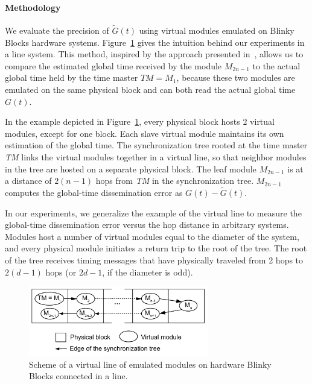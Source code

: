 \paragraph{Methodology}

We evaluate the precision of $\tilde{G}(t)$ using virtual modules emulated on Blinky Blocks hardware systems. Figure~\ref{fig:time-sync:virtual-line} gives the intuition behind our experiments in a line system. This method, inspired by the approach presented in~\cite{romer2005time}, allows us to compare the estimated global time received by the module $M_{2n-1}$ to the actual global time held by the time master $\mathrm{\textit{TM}}  = M_1$, because these two modules are emulated on the same physical block and can both read the actual global time $G(t)$. 

In the example depicted in Figure~\ref{fig:time-sync:virtual-line}, every physical block hosts 2 virtual modules, except for one block. Each slave virtual module maintains its own estimation of the global time. The synchronization tree rooted at the time master \textit{TM} links the virtual modules together in a virtual line, so that neighbor modules in the tree are hosted on a separate physical block. The leaf module $M_{2n-1}$ is at a distance of $2(n-1)$ hops from \textit{TM} in the synchronization tree. $M_{2n-1}$ computes the global-time dissemination error as $G(t) - \tilde{G}(t)$.

In our experiments, we generalize the example of the virtual line to measure the global-time dissemination error versus the hop distance in arbitrary systems. Modules host a number of virtual modules equal to the diameter of the system, and every physical module initiates a return trip to the root of the tree. The root of the tree receives timing messages that have physically traveled from 2 hops to $2(d-1)$ hops (or $2d-1$, if the diameter is odd). 

\begin{figure}[h!]
	\begin{center}
		\includegraphics[width=0.7\textwidth]{images/time-synchronization/virtual-line.pdf}
	\end{center}
	\caption{Scheme of a virtual line of emulated modules on hardware Blinky Blocks connected in a line.}
	\label{fig:time-sync:virtual-line}
\end{figure}

